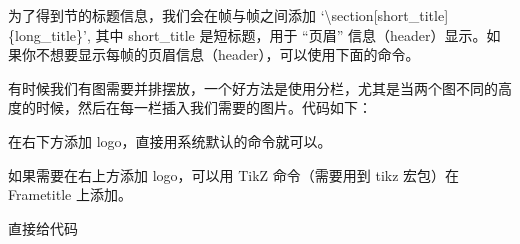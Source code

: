 \begin{texinlist}
\end{texinlist}

为了得到节的标题信息，我们会在帧与帧之间添加
`\textbackslash{}section{[}short\_title{]}\{long\_title\}', 其中
short\_title 是短标题，用于 ``页眉''
信息（header）显示。如果你不想要显示每帧的页眉信息（header），可以使用下面的命令。

\begin{texinlist}
\end{texinlist}



有时候我们有图需要并排摆放，一个好方法是使用分栏，尤其是当两个图不同的高度的时候，然后在每一栏插入我们需要的图片。代码如下：

\begin{texinlist}
\end{texinlist}



在右下方添加 logo，直接用系统默认的命令就可以。

\begin{texinlist}
\end{texinlist}

如果需要在右上方添加 logo，可以用 TikZ 命令（需要用到 tikz 宏包）在
Frametitle 上添加。

\begin{texinlist}
\end{texinlist}



直接给代码

\begin{texinlist}
\newenvironment{question}
{\begin{frame}[environment=question,fragile]
 \begin{theorem}
}
{\end{theorem}
 \end{frame}
}
\end{texinlist}




